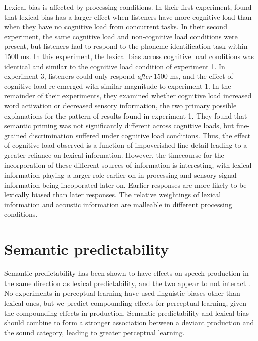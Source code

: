 Lexical bias is affected by processing conditions.  
In their first experiment, \citet{Mattys2011} found that lexical bias has a larger effect when listeners have more cognitive load than when they have no cognitive load from concurrent tasks.  
In their second experiment, the same cognitive load and non-cognitive load conditions were present, but listeners had to respond to the phoneme identification task within 1500 ms.  
In this experiment, the lexical bias across cognitive load conditions was identical and similar to the cognitive load condition of experiment 1.  
In experiment 3, listeners could only respond \emph{after} 1500 ms, and the effect of cognitive load re-emerged with similar magnitude to experiment 1.  
In the remainder of their experiments, they examined whether cognitive load increased word activation or decreased sensory information, the two primary possible explanations for the pattern of results found in experiment 1.  
They found that semantic priming was not significantly different across cognitive loads, but fine-grained discrimination suffered under cognitive load conditions.  
Thus, the effect of cognitive load observed is a function of impoverished fine detail leading to a greater reliance on lexical information.  
However, the timecourse for the incorporation of these different sources of information is interesting, with lexical information playing a larger role earlier on in processing and sensory signal information being incoporated later on.  
Earlier responses are more likely to be lexically biased than later responses.
The relative weightings of lexical information and acoustic information are malleable in different processing conditions.

\section{Semantic predictability}
\label{sec:semanticpredictability}

Semantic predictability has been shown to have effects on speech production in the same direction as lexical predictability, and the two appear to not interact \citep{Scarborough2010}.  No experiments in perceptual learning have used linguistic biases other than lexical ones, but we predict compounding effects for perceptual learning, given the compounding effects in production.  Semantic predictability and lexical bias should combine to form a stronger association between a deviant production and the sound category, leading to greater perceptual learning.

